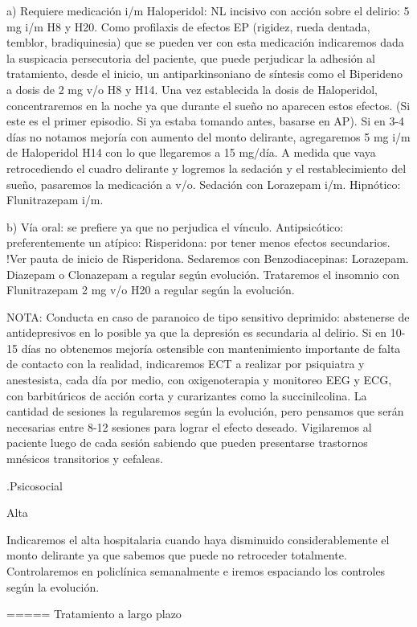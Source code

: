 a) Requiere medicación i/m Haloperidol: NL incisivo con acción sobre el delirio: 5 mg i/m H8 y H20. Como profilaxis de efectos EP (rigidez, rueda dentada, temblor, bradiquinesia) que se pueden ver con esta medicación indicaremos dada la suspicacia persecutoria del paciente, que puede perjudicar la adhesión al tratamiento, desde el inicio, un antiparkinsoniano de síntesis como el Biperideno a dosis de 2 mg v/o H8 y H14. Una vez establecida la dosis de Haloperidol, concentraremos en la noche ya que durante el sueño no aparecen estos efectos. (Si este es el primer episodio. Si ya estaba tomando antes, basarse en AP). Si en 3-4 días no notamos mejoría con aumento del monto delirante, agregaremos 5 mg i/m de Haloperidol H14 con lo que llegaremos a 15 mg/día. A medida que vaya retrocediendo el cuadro delirante y logremos la sedación y el restablecimiento del sueño, pasaremos la medicación a v/o. Sedación con Lorazepam i/m. Hipnótico: Flunitrazepam i/m.

b) Vía oral: se prefiere ya que no perjudica el vínculo. Antipsicótico: preferentemente un atípico: Risperidona: por tener menos efectos secundarios. !Ver pauta de inicio de Risperidona. Sedaremos con Benzodiacepinas: Lorazepam. Diazepam o Clonazepam a regular según evolución. Trataremos el insomnio con Flunitrazepam 2 mg v/o H20 a regular según la evolución.

NOTA: Conducta en caso de paranoico de tipo sensitivo deprimido: abstenerse de antidepresivos en lo posible ya que la depresión es secundaria al delirio. Si en 10-15 días no obtenemos mejoría ostensible con mantenimiento importante de falta de contacto con la realidad, indicaremos ECT a realizar por psiquiatra y anestesista, cada día por medio, con oxigenoterapia y monitoreo EEG y ECG, con barbitúricos de acción corta y curarizantes como la succinilcolina. La cantidad de sesiones la regularemos según la evolución, pero pensamos que serán necesarias entre 8-12 sesiones para lograr el efecto deseado. Vigilaremos al paciente luego de cada sesión sabiendo que pueden presentarse trastornos mnésicos transitorios y cefaleas.

.Psicosocial


Alta

Indicaremos el alta hospitalaria cuando haya disminuido considerablemente el monto delirante ya que sabemos que puede no retroceder totalmente. Controlaremos en policlínica semanalmente e iremos espaciando los controles según la evolución.

===== Tratamiento a largo plazo


